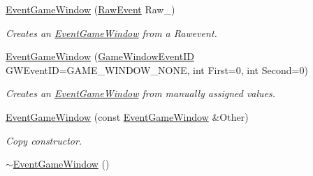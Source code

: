 \begin{DoxyCompactItemize}
\item 
\hyperlink{classphys_1_1EventGameWindow_aca917d4cf8ee17dd5253c294aac75bb8}{EventGameWindow} (\hyperlink{namespacephys_a8126d26e4507e66d09876988bb941fd4}{RawEvent} Raw\_\-)
\begin{DoxyCompactList}\small\item\em Creates an \hyperlink{classphys_1_1EventGameWindow}{EventGameWindow} from a Rawevent. \item\end{DoxyCompactList}\item 
\hyperlink{classphys_1_1EventGameWindow_aa9d3325376d97c6426c3f98e180352e9}{EventGameWindow} (\hyperlink{classphys_1_1EventGameWindow_a45225255070513d3cff88cdfea25cc09}{GameWindowEventID} GWEventID=GAME\_\-WINDOW\_\-NONE, int First=0, int Second=0)
\begin{DoxyCompactList}\small\item\em Creates an \hyperlink{classphys_1_1EventGameWindow}{EventGameWindow} from manually assigned values. \item\end{DoxyCompactList}\item 
\hyperlink{classphys_1_1EventGameWindow_a4011621e2c6fc55a9c89a489f90dc1c8}{EventGameWindow} (const \hyperlink{classphys_1_1EventGameWindow}{EventGameWindow} \&Other)
\begin{DoxyCompactList}\small\item\em Copy constructor. \item\end{DoxyCompactList}\item 
\hypertarget{classphys_1_1EventGameWindow_aa6e0b4f13327caaaab3e4656e6a9fa13}{
\hyperlink{classphys_1_1EventGameWindow_aa6e0b4f13327caaaab3e4656e6a9fa13}{$\sim$EventGameWindow} ()}
\label{d4/d0f/classphys_1_1EventGameWindow_aa6e0b4f13327caaaab3e4656e6a9fa13}


\end{DoxyCompactItemize}
